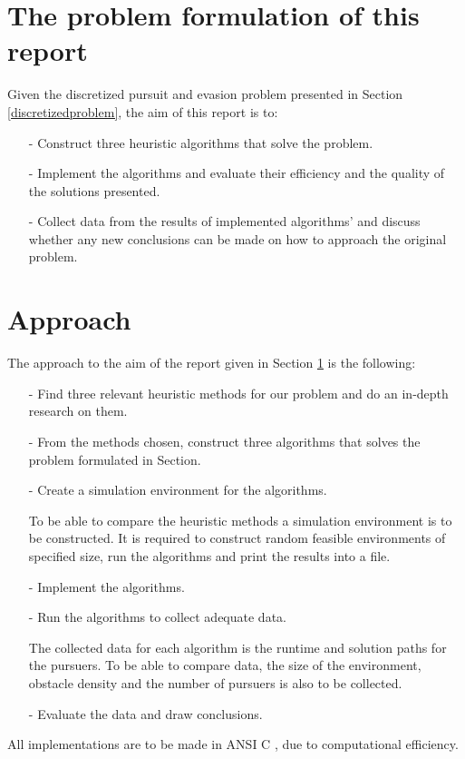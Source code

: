 \section{The problem formulation of this report}\label{ourproblemformulation}
Given the discretized pursuit and evasion problem presented in Section \ref{discretizedproblem}, the aim of this report is to:
\begin{enumerate}
\item[-] Construct three heuristic algorithms that solve the problem.
\item[-] Implement the algorithms and evaluate their efficiency and the quality of the solutions presented.
\item[-] Collect data from the results of implemented algorithms' and discuss whether any new conclusions can be made on how to approach the original problem.
\end{enumerate}
\section{Approach}
The approach to the aim of the report given in Section \ref{ourproblemformulation} is the following:
\begin{enumerate}
\item[-] Find three relevant heuristic methods for our problem and do an in-depth research on them.
\item[-] From the methods chosen, construct three algorithms that solves the problem formulated in Section.
\item[-] Create a simulation environment for the algorithms.
\par{To be able to compare the heuristic methods a simulation environment is to be constructed. It is required to construct random feasible environments of specified size, run the algorithms and print the results into a file.}
\item[-] Implement the algorithms.
\item[-] Run the algorithms to collect adequate data.
\par{The collected data for each algorithm is the runtime and solution paths for the pursuers. To be able to compare data, the size of the environment, obstacle density and the number of pursuers is also to be collected.}
\item[-] Evaluate the data and draw conclusions.
\end{enumerate}
All implementations are to be made in ANSI C \cite{C-bok}, due to computational efficiency.